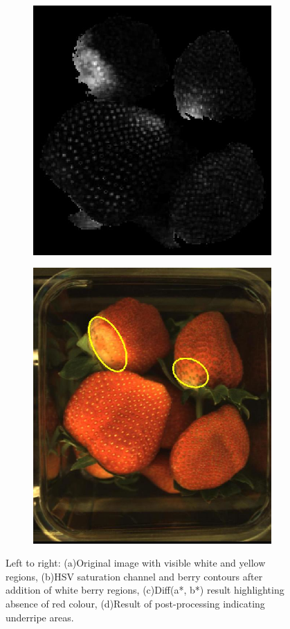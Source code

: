\documentclass[conference]{IEEEtran}
\begin{document}
\begin{figure}[ht]
	\begin{subfigure}{.25\textwidth}
		\centering
		\includegraphics[width=.9\linewidth]{eps/pow_image.eps}
		\caption{}
		\label{fig:pow_image}
	\end{subfigure}%
	\begin{subfigure}{.25\textwidth}
		\centering
		\includegraphics[width=.9\linewidth]{eps/result.eps}
		\caption{}
		\label{fig:result}
	\end{subfigure}%
	
	\caption{Left to right: (a)Original image with visible white and yellow regions, (b)HSV saturation channel and berry contours after addition of white berry regions, (c)Diff(a*, b*) result highlighting absence of red colour, (d)Result of post-processing indicating underripe areas.}
	\label{fig:underripe_process}
\end{figure}
\end{document}
